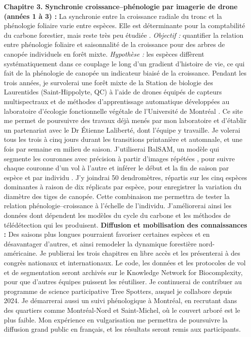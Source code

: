 \documentclass[12pt]{article}
\begin{document}
\textbf{Chapitre 3. Synchronie croissance--phénologie par imagerie de drone (années 1 à 3) :}
La synchronie entre la croissance radiale du tronc et la phénologie foliaire varie entre espèces. Elle est déterminante pour la comptabilité du carbone forestier, mais reste très peu étudiée \cite{klein_coordination_2016,kramer_importance_2000}. \textit{Objectif :} quantifier la relation entre phénologie foliaire et saisonnalité de la croissance pour des arbres de canopée individuels en forêt mixte. \textit{Hypothèse :} les espèces diffèrent systématiquement dans ce couplage le long d'un gradient d'histoire de vie, ce qui fait de la phénologie de canopée un indicateur biaisé de la croissance. Pendant les trois années, je survolerai une forêt mixte de la Station de biologie des Laurentides (Saint-Hippolyte, QC) à l'aide de drones équipés de capteurs multispectraux et de méthodes d'apprentissage automatique \cite{ball_accurate_2023,ulku_deep_2022} développées au laboratoire d'écologie fonctionnelle végétale de l'Université de Montréal \cite{cloutier_influence_2024}. Ce site me permet de poursuivre des travaux déjà menés par mon laboratoire \cite{flynn_temperature_2018} et d'établir un partenariat avec le Dr Étienne Laliberté, dont l'équipe y travaille. Je volerai tous les trois à cinq jours durant les transitions printanière et automnale, et une fois par semaine en milieu de saison. J'utiliserai BalSAM, un modèle qui segmente les couronnes avec précision à partir d'images répétées \cite{teng_bringing_2025}, pour suivre chaque couronne d'un vol à l'autre et inférer le début et la fin de saison par espèce et par individu \cite{berra_assessing_2019,fawcett_monitoring_2021}. J'y joindrai 50 dendromètres, répartis sur les cinq espèces dominantes à raison de dix réplicats par espèce, pour enregistrer la variation du diamètre des tiges de canopée. Cette combinaison me permettra de tester la relation phénologie--croissance à l'échelle de l'individu. J'améliorerai ainsi les données dont dépendent les modèles du cycle du carbone \cite{richardson_climate_2013,swidrak_comparing_2013} et les méthodes de télédétection qui les produisent.
\textbf{Diffusion et mobilisation des connaissances :}
Des saisons plus longues pourraient favoriser certaines espèces et en désavantager d'autres, et ainsi remodeler la dynamique forestière nord-américaine. Je publierai les trois chapitres en libre accès et les présenterai à des congrès nationaux et internationaux. Le code, les données et les protocoles de vol et de segmentation seront archivés sur le Knowledge Network for Biocomplexity, pour que d'autres équipes puissent les réutiliser. Je continuerai de contribuer au programme de science participative Tree Spotters, auquel je collabore depuis 2024. Je démarrerai aussi un suivi phénologique à Montréal, en recrutant dans des quartiers comme Montréal-Nord et Saint-Michel, où le couvert arboré est le plus faible. Mon expérience en vulgarisation me permettra de poursuivre la diffusion grand public en français, et les résultats seront remis aux participants.
\newpage


\end{document}
